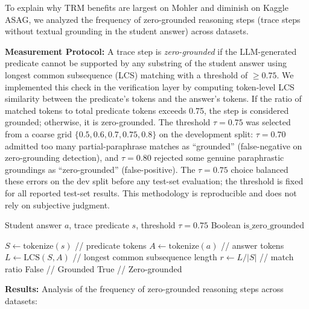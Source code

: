 \documentclass[conference]{IEEEtran}
\begin{document}
To explain why TRM benefits are largest on Mohler and diminish on Kaggle ASAG, we
analyzed the frequency of zero-grounded reasoning steps (trace steps without textual
grounding in the student answer) across datasets.

\textbf{Measurement Protocol:} A trace step is \emph{zero-grounded} if the LLM-generated
predicate cannot be supported by any substring of the student answer using longest common
subsequence (LCS) matching with a threshold of $\geq 0.75$. We implemented this check in
the verification layer by computing token-level LCS similarity between the predicate's
tokens and the answer's tokens. If the ratio of matched tokens to total predicate tokens
exceeds 0.75, the step is considered grounded; otherwise, it is zero-grounded. The
threshold $\tau = 0.75$ was selected from a coarse grid $\{0.5, 0.6, 0.7, 0.75, 0.8\}$
on the development split: $\tau = 0.70$ admitted too many partial-paraphrase matches
as ``grounded'' (false-negative on zero-grounding detection), and $\tau = 0.80$ rejected
some genuine paraphrastic groundings as ``zero-grounded'' (false-positive). The
$\tau = 0.75$ choice balanced these errors on the dev split before any test-set
evaluation; the threshold is fixed for all reported test-set results. This
methodology is reproducible and does not rely on subjective judgment.

\begin{algorithm}[h]
\caption{Zero-Grounding Detection}
\label{alg:grounding}
\begin{algorithmic}
  \REQUIRE Student answer $a$, trace predicate $s$, threshold $\tau = 0.75$
  \ENSURE Boolean $\text{is\_zero\_grounded}$

  \STATE $S \gets \text{tokenize}(s)$ \quad // predicate tokens
  \STATE $A \gets \text{tokenize}(a)$ \quad // answer tokens
  \STATE $L \gets \text{LCS}(S, A)$ \quad // longest common subsequence length
  \STATE $r \gets L / |S|$ \quad // match ratio
    \RETURN False \quad // Grounded
  \ELSE
    \RETURN True \quad // Zero-grounded
  \ENDIF
\end{algorithmic}
\end{algorithm}

\textbf{Results:} Analysis of the frequency of zero-grounded reasoning steps across
datasets:
\end{document}
